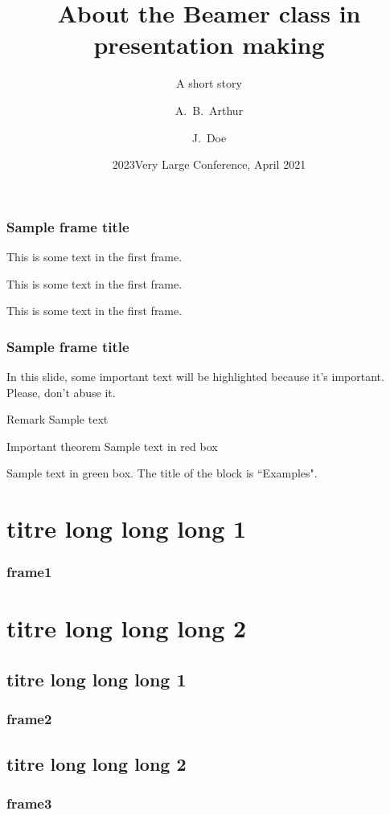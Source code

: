 \documentclass{beamer}
\date{2023}
\title[About Beamer] %
{About the Beamer class in presentation making}
\subtitle{A short story}
\author[Arthur, Doe] %
{A.~B.~Arthur\inst{1} \and J.~Doe\inst{2}}
\institute[VFU] %
{
  \inst{1}%
  Faculty of Physics\\
  Very Famous University
  \and
  \inst{2}%
  Faculty of Chemistry\\
  Very Famous University
}
\date[02/05/2024] %
{Very Large Conference, April 2021}
\begin{document}
\frame{\titlepage}

\begin{frame}
  \frametitle{Sample frame title}
  This is some text in the first frame. \pause

  This is some text in the first frame. 

  This is some text in the first frame.
\end{frame}

\begin{frame}
  \frametitle{Sample frame title}

  In this slide, some important text will be
  \alert{highlighted} because it's important.
  Please, don't abuse it.

  \begin{block}{Remark}
    Sample text
  \end{block}

  \begin{alertblock}{Important theorem}
    Sample text in red box
  \end{alertblock}

  \begin{examples}
    Sample text in green box. The title of the block is ``Examples".
  \end{examples}
\end{frame}

\section[titre court1]{titre long long long 1}
\begin{frame}
  \frametitle{frame1}
\end{frame}

\section[titre court2]{titre long long long 2}

\subsection[titre court1]{titre long long long 1}
\begin{frame}
  \frametitle{frame2}
\end{frame}

\subsection[titre court2]{titre long long long 2}
\begin{frame}
  \frametitle{frame3}
\end{frame}
\end{document}
